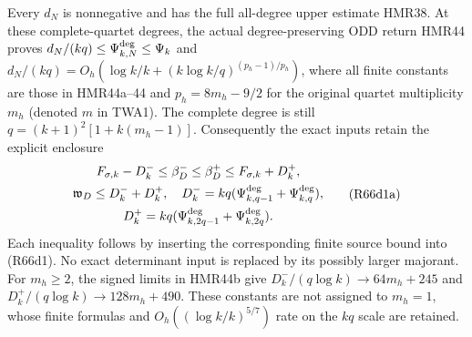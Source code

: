 Every $d_N$ is nonnegative and has the full all-degree
upper estimate HMR38. At these complete-quartet degrees,
the actual degree-preserving ODD return HMR44 proves
$d_N/(kq)\leq\Psi_{k,N}^{\rm deg}\leq\Psi_k$ and
$d_N/(kq)=O_h(\log k/k+(k\log k/q)^{(p_h-1)/p_h})$,
where all finite constants are those in HMR44a--44 and
$p_h=8m_h-9/2$ for the original quartet multiplicity $m_h$
(denoted $m$ in TWA1). The complete degree is still
$q=(k+1)^2[1+k(m_h-1)]$. Consequently the exact inputs retain
the explicit enclosure
\[
\begin{gathered}
 F_{\sigma,k}-D_k^-\leq\beta_D^-\leq\beta_D^+
                         \leq F_{\sigma,k}+D_k^+,\\
 \mathfrak w_D\leq D_k^-+D_k^+,
 \quad D_k^-=kq(\Psi_{k,q-1}^{\rm deg}+\Psi_{k,q}^{\rm deg}),\\
 D_k^+=kq(\Psi_{k,2q-1}^{\rm deg}+\Psi_{k,2q}^{\rm deg}).
\end{gathered}\tag{R66d1a}
\]
Each inequality follows by inserting the corresponding finite
source bound into (R66d1). No exact determinant input is replaced
by its possibly larger majorant. For $m_h\geq2$, the signed
limits in HMR44b give
$D_k^-/(q\log k)\to64m_h+245$ and
$D_k^+/(q\log k)\to128m_h+490$. These constants are not
assigned to $m_h=1$, whose finite formulas and
$O_h((\log k/k)^{5/7})$ rate on the $kq$ scale are retained.